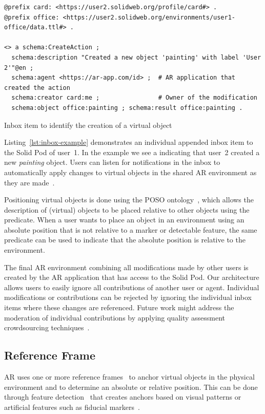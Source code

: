 \begin{listing}[htb]
\begin{verbatim}
@prefix card: <https://user2.solidweb.org/profile/card#> .
@prefix office: <https://user2.solidweb.org/environments/user1-office/data.ttl#> .

<> a schema:CreateAction ;
  schema:description "Created a new object 'painting' with label 'User 2'"@en ;
  schema:agent <https://ar-app.com/id> ;  # AR application that created the action
  schema:creator card:me ;                # Owner of the modification
  schema:object office:painting ; schema:result office:painting .
\end{verbatim}
\caption{Inbox item to identify the creation of a virtual object} \label{lst:inbox-example}
\end{listing}

Listing~\ref{lst:inbox-example} demonstrates an individual appended inbox item to the Solid Pod of user~1. In the example we see a  indicating that user~2 created a new \textit{painting} object. Users can listen for notifications in the inbox to automatically apply changes to virtual objects in the shared AR environment as they are made~\cite{10.1007/978-3-319-58068-5_33}.

Positioning virtual objects is done using the POSO ontology~\cite{10.1007/978-3-031-19433-7_14}, which allows the description of (virtual) objects to be placed relative to other objects using the  predicate. When a user wants to place an object in an environment using an absolute position that is not relative to a marker or detectable feature, the same predicate can be used to indicate that the absolute position is relative to the environment.

The final AR environment combining all modifications made by other users is created by the AR application that has access to the Solid Pod. Our architecture allows users to easily ignore all contributions of another user or agent. Individual modifications or contributions can be rejected by ignoring the individual inbox items where these changes are referenced. Future work might address the moderation of individual contributions by applying quality assessment crowdsourcing techniques~\cite{10.1007/978-3-642-41338-4_17}.

\subsection{Reference Frame}
AR uses one or more reference frames~\cite{mou2004frames} to anchor virtual objects in the physical environment and to determine an absolute or relative position. This can be done through feature detection~\cite{10.1145/3301275.3302278} that creates anchors based on visual patterns or artificial features such as fiducial markers~\cite{kalaitzakis2021fiducial}.

